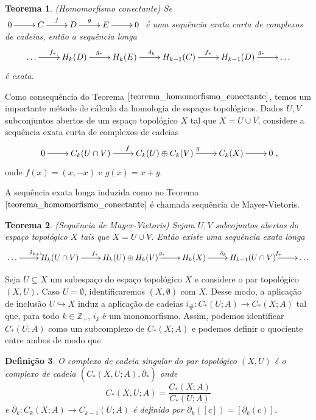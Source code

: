 \documentclass[12pt]{book}
\newtheorem{teorema}{Teorema}[section]
\newtheorem{definicao}[teorema]{Definição}
\newcommand{\bordo}[1]{\partial_{#1}}
\newcommand{\bordorel}[1]{\overline{\partial}_{#1}}
\newcommand{\cadeia}[2]{C_{#1}(#2; A)}
\newcommand{\classe}[1]{[#1]}
\newcommand{\homologiaabrev}[2]{H_{#1}(#2)}
\newcommand{\induzida}[1]{#1_{\#}}
\newcommand{\inteiros}{\mathbb{Z}}
\newcommand{\inteirospos}{\inteiros_{+}}
\begin{document}
	\begin{teorema}\label{teorema_homomorfismo_conectante}
		(Homomorfismo conectante) Se $ \xymatrix{0 \ar[r] & C\ar[r]^{f} & D\ar[r]^{g} & E \ar[r]& 0}$ é uma sequência exata curta de complexos de cadeias, então a sequência longa 
		$$
		\xymatrix{\dots \ar[r]^{f_{*}} & \homologiaabrev{k}{D}\ar[r]^{g_{*}} & \homologiaabrev{k}{E}\ar[r]^{\delta_{k}}& \homologiaabrev{k-1}{C}\ar[r]^{f_{*}} & \homologiaabrev{k-1}{D} \ar[r]^{g_{*}}& \dots} 
		$$
		é exata.
	\end{teorema}
	
	Como consequência do Teorema $\ref{teorema_homomorfismo_conectante}$, temos um importante método de cálculo da homologia de espaços topológicos. Dados $U, V$ subconjuntos abertos de um espaço topológico $X$ tal que $X = U\cup V$, considere a sequência exata curta de complexos de cadeias
	$$ 
	\xymatrix{0 \ar[r] & C_{k}(U\cap V)\ar[r]^{f} & C_{k}(U)\oplus C_{k}(V)\ar[r]^{g} & C_{k}(X) \ar[r]& 0},
	$$
	onde $f(x) = (x,-x)$ e $g(x) = x+y$.
	
	A sequência exata longa induzida como no Teorema $\ref{teorema_homomorfismo_conectante}$ é chamada sequência de Mayer-Vietoris.
	
	\begin{teorema}
		(Sequência de Mayer-Vietoris) Sejam $U, V$ subcojuntos abertos do espaço topológico $X$ tais que $X = U \cup V$. Então existe uma sequência exata longa 
		\[
		\xymatrix{\dots \ar[r]^{\delta_{k+1}} & \homologiaabrev{k}{U\cap V}\ar[r]^{f_{*}} & \homologiaabrev{k}{U}\oplus \homologiaabrev{k}{V}\ar[r]^{g_{*}}& \homologiaabrev{k}{X}\ar[r]^{\delta_{k}} & \homologiaabrev{k-1}{U \cap V} \ar[r]^{f_{*}}& \dots} 
		\]
	\end{teorema}
	
	Seja $U \subseteq X$ um subespaço do espaço topológico $X$ e considere o par topológico $(X, U)$. Caso $U = \emptyset$, identificaremos $(X, \emptyset)$ com $X$. Desse modo, a aplicação de inclusão $U \hookrightarrow X$ induz a aplicação de cadeias $\induzida{i}: \cadeia{*}{U} \to \cadeia{*}{X}$ tal que, para todo $k \in \inteirospos$, $i_{k}$ é um monomorfismo. Assim, podemos identificar $\cadeia{*}{U}$ como um subcomplexo de $\cadeia{*}{X}$ e podemos definir o quociente entre ambos de modo que
	
	\begin{definicao}
		O complexo de cadeia singular do par topológico $(X,U)$ é o complexo de cadeia $(\cadeia{*}{X,U},\bordorel{*} )$ onde 
		$$
		\cadeia{*}{X,U} = \frac{\cadeia{*}{X}}{\cadeia{*}{U}}
		$$
		e $\bordorel{k}: \cadeia{k}{X} \to \cadeia{k-1}{U}$ é definido por $\bordorel{k}(\classe{c}) = \classe{\bordo{k}(c)}$.
	\end{definicao}
	
\end{document}
